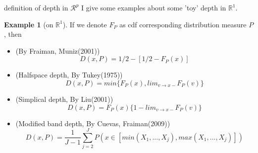 \documentclass[aspectratio=169,ignorenonframetext,9pt]{beamer}
\theoremstyle{plain}
\theoremstyle{definition}
\newtheorem{exmp}{Example}[section]
\begin{document}
\begin{frame}{definition of depth in $\mathcal{R}^p$}
I give some examples about some 'toy' depth in $\mathbb{R}^1$.
\begin{exmp} [on $\mathbb{R}^1$]
    If we denote $F_P$ as cdf corresponding distribution measure $P$, then
    \begin{itemize}
        \item (By Fraiman, Muniz(2001))
        \[D(x,P)=1/2-[1/2-F_P(x)]\]
        \item (Halfspace depth, By Tukey(1975))
        \[D(x,P)=min\{F_P(x), lim_{v\rightarrow x-}F_P(v)\}\]
        \item (Simplical depth, By Liu(2001))
        \[D(x,P)=F_P(x)\{1-lim_{v\rightarrow x-} F_P(v)\}\]
        \item (Modified band depth, By Cuevas, Fraiman(2009))
        \[D(x,P)=\frac{1}{J-1}\sum_{j=2}^J P(x\in [min(X_1,...,X_j), max(X_1,...,X_j)])\]
    \end{itemize}
\end{exmp}
\end{frame}
\end{document}
